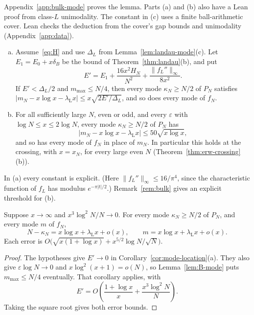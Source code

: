 Appendix~\ref{app:bulk-mode} proves the lemma. Parts (a) and (b) also
have a Lean proof from class-$L$ unimodality. The constant in (c) uses
a finite ball-arithmetic cover. Lean checks the deduction from the
cover's gap bounds and unimodality (Appendix~\ref{app:data}).

\begin{corollary}\label{cor:mode-location}
\begin{enumerate}[(a)]
\item Assume~\eqref{eq:H} and use $\Delta_L$ from
Lemma~\ref{lem:landau-mode}(c). Let
$E_1=E_0+x\delta_B$ be the bound of
Theorem~\ref{thm:landau}(b), and put
\[
 E'=E_1+\frac{16x^2H_N}{N^2}+\frac{\lVert f_L''\rVert_\infty}{8x^2}.
\]
If $E'<\Delta_L/2$ and $m_{\max}\le N/4$, then every mode $\kappa_N\ge N/2$ of $P_N$
satisfies $\lvert m_N-x\log x-\lambda_{\mathrm L}x\rvert\le x\sqrt{2E'/\Delta_L}$,
and so does every mode of $f_N$.
\item For all sufficiently large $N$, even or odd, and every
$\varepsilon$ with $\log N\le x\le2\log N$, every mode $\kappa_N\ge N/2$ of $P_N$ has
\[
 \bigl\lvert m_N-x\log x-\lambda_{\mathrm L}x\bigr\rvert\le50\sqrt{x\log x},
\]
and so has every mode of $f_N$ in place of $m_N$. In particular this holds at the crossing,
with $x=x_N$, for every large even $N$ (Theorem~\ref{thm:erw-crossing}(b)).
\end{enumerate}
In (a) every constant is explicit. (Here
$\lVert f_L''\rVert_\infty\le16/\pi^4$, since the characteristic function
of $f_L$ has modulus $e^{-\pi\lvert t\rvert/2}$.)
Remark~\ref{rem:bulk} gives an explicit threshold for (b).
\end{corollary}

\begin{corollary}\label{cor:wider-mode-range}
Suppose $x\to\infty$ and $x^3\log^2N/N\to0$. For every mode
$\kappa_N\ge N/2$ of $P_N$, and every mode $m$ of $f_N$,
\[
 N-\kappa_N=x\log x+\lambda_{\mathrm L}x+o(x),\qquad
 m=x\log x+\lambda_{\mathrm L}x+o(x).
\]
Each error is
$O\bigl(\sqrt{x(1+\log x)}+x^{5/2}\log N/\sqrt N\bigr)$.
\end{corollary}

\begin{proof}
The hypotheses give $E'\to0$ in Corollary~\ref{cor:mode-location}(a).
They also give $\varepsilon\log N\to0$ and
$x\log^2(x+1)=o(N)$, so Lemma~\ref{lem:B-mode} puts $m_{\max}\le N/4$
eventually. That corollary applies, with
\[
 E'=O\left(\frac{1+\log x}{x}+\frac{x^3\log^2N}{N}\right).
\]
Taking the square root gives both error bounds.
\end{proof}


